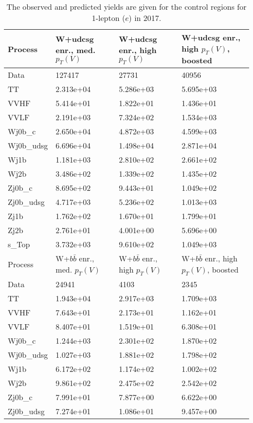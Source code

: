 \begin{table}
\centering
\caption[2017 1-lepton ($e$) control region yields]{
                  The observed and predicted yields are given for the
                  control regions for 1-lepton ($e$) in 2017.
                  }
{\footnotesize
\begin{tabularx}{0.8\textwidth}{|X|X|X|X|}
\hline
Process & W+udcsg enr., med. $p_{T}(V)$ & W+udcsg enr., high $p_{T}(V)$ & W+udcsg enr., high $p_{T}(V)$, boosted \\
\hline
Data & 127417 & 27731 & 40956 \\
\hline
TT & 2.313e+04 & 5.286e+03 & 5.695e+03 \\
VVHF & 5.414e+01 & 1.822e+01 & 1.436e+01 \\
VVLF & 2.191e+03 & 7.324e+02 & 1.534e+03 \\
Wj0b\_c & 2.650e+04 & 4.872e+03 & 4.599e+03 \\
Wj0b\_udsg & 6.696e+04 & 1.498e+04 & 2.871e+04 \\
Wj1b & 1.181e+03 & 2.810e+02 & 2.661e+02 \\
Wj2b & 3.486e+02 & 1.339e+02 & 1.435e+02 \\
Zj0b\_c & 8.695e+02 & 9.443e+01 & 1.049e+02 \\
Zj0b\_udsg & 4.717e+03 & 5.236e+02 & 1.013e+03 \\
Zj1b & 1.762e+02 & 1.670e+01 & 1.799e+01 \\
Zj2b & 2.761e+01 & 4.001e+00 & 5.696e+00 \\
s\_Top & 3.732e+03 & 9.610e+02 & 1.049e+03 \\
\hline
\hline
Process & W+$b\bar{b}$ enr., med. $p_{T}(V)$ & W+$b\bar{b}$ enr., high $p_{T}(V)$ & W+$b\bar{b}$ enr., high $p_{T}(V)$, boosted \\
\hline
Data & 24941 & 4103 & 2345 \\
\hline
TT & 1.943e+04 & 2.917e+03 & 1.709e+03 \\
VVHF & 7.643e+01 & 2.173e+01 & 1.162e+01 \\
VVLF & 8.407e+01 & 1.519e+01 & 6.308e+01 \\
Wj0b\_c & 1.244e+03 & 2.301e+02 & 1.870e+02 \\
Wj0b\_udsg & 1.027e+03 & 1.881e+02 & 1.798e+02 \\
Wj1b & 6.172e+02 & 1.174e+02 & 1.002e+02 \\
Wj2b & 9.861e+02 & 2.475e+02 & 2.542e+02 \\
Zj0b\_c & 7.991e+01 & 7.877e+00 & 6.622e+00 \\
Zj0b\_udsg & 7.274e+01 & 1.086e+01 & 9.457e+00 \\

\end{tabularx}}
\end{table}

